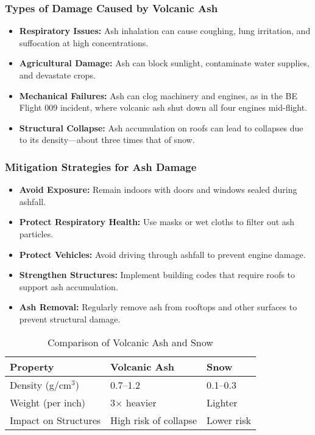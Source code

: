 \documentclass{article}
\begin{document}
\subsubsection{Types of Damage Caused by Volcanic Ash}
\begin{itemize}
    \item \textbf{Respiratory Issues:} Ash inhalation can cause coughing, lung irritation, and suffocation at high concentrations.
    \item \textbf{Agricultural Damage:} Ash can block sunlight, contaminate water supplies, and devastate crops.
    \item \textbf{Mechanical Failures:} Ash can clog machinery and engines, as in the BE Flight 009 incident, where volcanic ash shut down all four engines mid-flight.
    \item \textbf{Structural Collapse:} Ash accumulation on roofs can lead to collapses due to its density—about three times that of snow.
\end{itemize}

\subsubsection{Mitigation Strategies for Ash Damage}
\begin{itemize}
    \item \textbf{Avoid Exposure:} Remain indoors with doors and windows sealed during ashfall.
    \item \textbf{Protect Respiratory Health:} Use masks or wet cloths to filter out ash particles.
    \item \textbf{Protect Vehicles:} Avoid driving through ashfall to prevent engine damage.
    \item \textbf{Strengthen Structures:} Implement building codes that require roofs to support ash accumulation.
    \item \textbf{Ash Removal:} Regularly remove ash from rooftops and other surfaces to prevent structural damage.
\end{itemize}

\begin{table}[h]
\centering
\caption{Comparison of Volcanic Ash and Snow}
\begin{tabular}{@{}lll@{}}
\toprule
\textbf{Property}         & \textbf{Volcanic Ash} & \textbf{Snow} \\ \midrule
Density (g/cm$^3$)        & 0.7--1.2               & 0.1--0.3      \\
Weight (per inch)         & 3$\times$ heavier      & Lighter        \\
Impact on Structures      & High risk of collapse  & Lower risk     \\ \bottomrule
\end{tabular}
\end{table}
\end{document}
